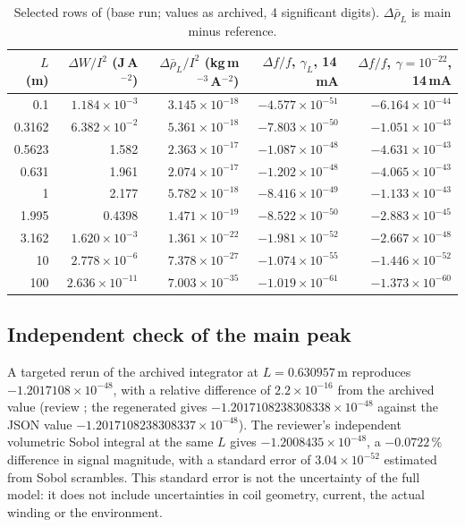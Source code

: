 \documentclass[12pt,a4paper]{article}
\newcommand{\e}[1]{\times10^{#1}}
\newcommand{\filec}[1]{\texttt{\detokenize{#1}}}
\begin{document}
\begin{table}[t]
\centering
\caption{Selected rows of \filec{csv/tal_differential_vs_L.csv} (base run; values as archived, 4 significant
digits). $\Delta\bar\rho_L$ is main minus reference.}
\label{tab:signal}
\small
\begin{tabular}{rrrrr}
\toprule
$L$ (m) & $\Delta W/I^2$ (J\,A$^{-2}$) & $\Delta\bar\rho_L/I^2$ (kg\,m$^{-3}$\,A$^{-2}$) &
$\Delta f/f$, $\gamma_L$, 14\,mA & $\Delta f/f$, $\gamma=10^{-22}$, 14\,mA\\
\midrule
0.1    & $1.184\e{-3}$ & $3.145\e{-18}$ & $-4.577\e{-51}$ & $-6.164\e{-44}$\\
0.3162 & $6.382\e{-2}$ & $5.361\e{-18}$ & $-7.803\e{-50}$ & $-1.051\e{-43}$\\
0.5623 & 1.582 & $2.363\e{-17}$ & $-1.087\e{-48}$ & $-4.631\e{-43}$\\
0.631  & 1.961 & $2.074\e{-17}$ & $-1.202\e{-48}$ & $-4.065\e{-43}$\\
1      & 2.177 & $5.782\e{-18}$ & $-8.416\e{-49}$ & $-1.133\e{-43}$\\
1.995  & 0.4398 & $1.471\e{-19}$ & $-8.522\e{-50}$ & $-2.883\e{-45}$\\
3.162  & $1.620\e{-3}$ & $1.361\e{-22}$ & $-1.981\e{-52}$ & $-2.667\e{-48}$\\
10     & $2.778\e{-6}$ & $7.378\e{-27}$ & $-1.074\e{-55}$ & $-1.446\e{-52}$\\
100    & $2.636\e{-11}$ & $7.003\e{-35}$ & $-1.019\e{-61}$ & $-1.373\e{-60}$\\
\bottomrule
\end{tabular}
\end{table}

\subsection{Independent check of the main peak}
A targeted rerun of the archived integrator at $L=0.630957$\,m reproduces $-1.2017108\times10^{-48}$, with a
relative difference of $2.2\times10^{-16}$ from the archived value (review \cite{TAL_V20}; the regenerated
 gives $-1.2017108238308338\times10^{-48}$ against the JSON value
$-1.2017108238308337\times10^{-48}$). The reviewer's independent volumetric Sobol integral at the same $L$ gives
$-1.2008435\times10^{-48}$, a $-0.0722\,\%$ difference in signal magnitude, with a standard error of
$3.04\times10^{-52}$ estimated from Sobol scrambles. This standard error is not the uncertainty of the full
model: it does not include uncertainties in coil geometry, current, the actual winding or the environment.
\end{document}
